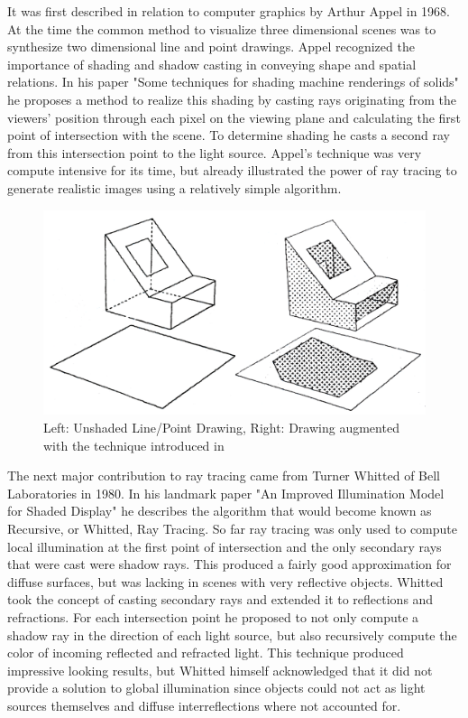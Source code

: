 \documentclass{ACGSeminar}
\begin{document}
It was first described in relation to computer graphics by Arthur Appel in 1968. At the time the common method to visualize three dimensional scenes was to synthesize two dimensional line and point drawings. Appel recognized the importance of shading and shadow casting in conveying shape and spatial relations. In his paper "Some techniques for shading machine renderings of solids" he proposes a method to realize this shading by casting rays originating from the viewers' position through each pixel on the viewing plane and calculating the first point of intersection with the scene. To determine shading he casts a second ray from this intersection point to the light source. Appel's technique was very compute intensive for its time, but already illustrated the power of ray tracing to generate realistic images using a relatively simple algorithm. \cite{Appel68}

\begin{figure}[htb!]
  \begin{centering}
    \includegraphics[width=12cm,natwidth=1233,natheight=661]{figures/Appel_Shading.png}\par
  \end{centering}
  \caption{Left: Unshaded Line/Point Drawing, Right: Drawing augmented with the technique introduced in \cite{Appel68}}
  \label{fig:appel_tracing}
\end{figure}

The next major contribution to ray tracing came from Turner Whitted of Bell Laboratories in 1980. In his landmark paper "An Improved Illumination Model for Shaded Display" \cite{Whitted:1980} he describes the algorithm that would become known as Recursive, or Whitted, Ray Tracing. So far ray tracing was only used to compute local illumination at the first point of intersection and the only secondary rays that were cast were shadow rays. This produced a fairly good approximation for diffuse surfaces, but was lacking in scenes with very reflective objects. Whitted took the concept of casting secondary rays and extended it to reflections and refractions. For each intersection point he proposed to not only compute a shadow ray in the direction of each light source, but also recursively compute the color of incoming reflected and refracted light. This technique produced impressive looking results, but Whitted himself acknowledged that it did not provide a solution to global illumination since objects could not act as light sources themselves and diffuse interreflections where not accounted for.
\end{document}
